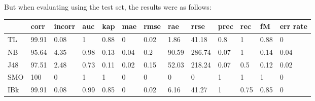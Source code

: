 \documentclass[a4paper,12pt, english]{article}
\begin{document}
But when evaluating using the test set, the results were as follows:
\begin{small}
\begin{center}
    \begin{tabular}{ | l | l | l | l | l | l | l | l | l | l | l | l | l |}
    \hline
      	& corr & incorr  & auc & kap & mae & rmse & rae & rrse & prec & rec & fM & err rate\\ \hline
      	TL & 99.91 & 0.08 & 1 & 0.88 & 0 & 0.02 & 1.86 & 41.18 & 0.8 & 1 & 0.88 & 0\\ \hline
	NB & 95.64 & 4.35 & 0.98 & 0.13 & 0.04 & 0.2 & 90.59 & 286.74 & 0.07 & 1 & 0.14 & 0.04\\ \hline
	J48 & 97.51 & 2.48 & 0.73 & 0.11 & 0.02 & 0.15 & 52.03 & 218.24 & 0.07 & 0.5 & 0.12 & 0.02\\ \hline
	SMO & 100 & 0 & 1 & 1 & 0 & 0 & 0 & 0 & 1 & 1 & 1 & 0\\ \hline
	IBk & 99.91 & 0.08 & 0.99 & 0.85 & 0 & 0.02 & 6.16 & 41.27 & 1 & 0.75 & 0.85 & 0\\ \hline  
    \end{tabular}       
\end{center}
\end{small}




\end{document}
